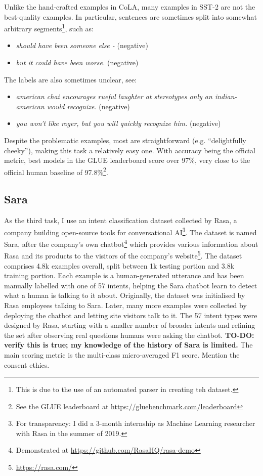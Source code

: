 \documentclass[bsc,frontabs,twoside,singlespacing,parskip,deptreport]{infthesis}
\begin{document}
{{{      Unlike the hand-crafted examples in CoLA, many examples in SST-2 are not the best-quality examples. In particular, sentences are sometimes split into somewhat arbitrary segments\footnote{This is due to the use of an automated parser in creating teh dataset.}, such as:
      \begin{itemize}
        \item \textit{should have been someone else - } (negative)
        \item \textit{but it could have been worse.} (negative)
      \end{itemize}
      
      The labels are also sometimes unclear, see:
      \begin{itemize}
        \item \textit{american chai encourages rueful laughter at stereotypes only an indian-american would recognize.} (negative)
        \item \textit{you won't like roger, but you will quickly recognize him.} (negative)
      \end{itemize}

      Despite the problematic examples, most are straightforward (e.g. ``delightfully cheeky''), making this task a relatively easy one. With accuracy being the official metric, best models in the GLUE leaderboard score over 97\%, very close to the official human baseline of 97.8\%\footnote{See the GLUE leaderboard at \url{https://gluebenchmark.com/leaderboard}}.
    }

    \subsection{Sara}{
      \label{sec:datasets-Sara}
      As the third task, I use an intent classification dataset collected by Rasa, a company building open-source tools for conversational AI\footnote{For transparency: I did a 3-month internship as Machine Learning researcher with Rasa in the summer of 2019.}. The dataset is named Sara, after the company's own chatbot\footnote{Demonstrated at \url{https://github.com/RasaHQ/rasa-demo}} which provides various information about Rasa and its products to the visitors of the company's website\footnote{\url{https://rasa.com/}}. The dataset comprises 4.8k examples overall, split between 1k testing portion and 3.8k training portion. Each example is a human-generated utterance and has been manually labelled with one of 57 intents, helping the Sara chatbot learn to detect what a human is talking to it about. Originally, the dataset was initialised by Rasa employees talking to Sara. Later, many more examples were collected by deploying the chatbot and letting site visitors talk to it. The 57 intent types were designed by Rasa, starting with a smaller number of broader intents and refining the set after observing real questions humans were asking the chatbot. \textbf{TO-DO: verify this is true; my knowledge of the history of Sara is limited.} The main scoring metric is the multi-class micro-averaged F1 score.
      Mention the consent ethics.

}}}
\end{document}
